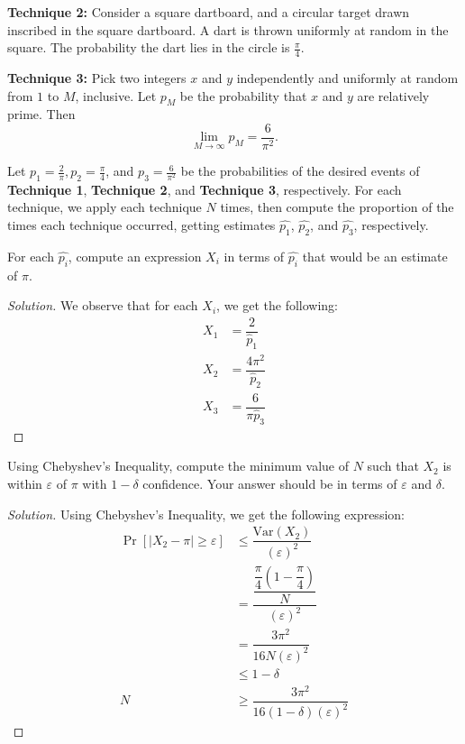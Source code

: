 \documentclass{article}
\newenvironment{solution}{\begin{proof}[Solution]}{\end{proof}}
\newcommand{\Var}{\mathrm{Var}}
\begin{document}
\textbf{Technique 2:} Consider a square dartboard, and a circular target drawn inscribed in the square dartboard. A dart is thrown uniformly at random in the square. The probability the dart lies in the circle is $\frac{\pi}{4}$.

\textbf{Technique 3:} Pick two integers $x$ and $y$ independently and uniformly at random from $1$ to $M$, inclusive. Let $p_M$ be the probability that $x$ and $y$ are relatively prime. Then 
\[\lim_{M \to \infty} p_M = \frac{6}{\pi^2}.\]

Let $p_1 = \frac{2}{\pi}, p_2 = \frac{\pi}{4}$, and $p_3 = \frac{6}{\pi^2}$ be the probabilities of the desired events of \textbf{Technique 1}, \textbf{Technique 2}, and \textbf{Technique 3}, respectively. For each technique, we apply each technique $N$ times, then compute the proportion of the times each technique occurred, getting estimates $\hat{p_1}$, $\hat{p_2}$, and $\hat{p_3}$, respectively.

\begin{hw}
	For each $\hat{p_i}$, compute an expression $X_i$ in terms of $\hat{p_i}$ that would be an estimate of $\pi$.
\end{hw}
\begin{solution}
	We observe that for each $X_{i}$, we get the following:
	\begin{align*}
		X_{1} &= \dfrac{2}{\hat{p}_{1}} \\
		X_{2} &= \dfrac{4\pi^{2}}{\hat{p}_{2}} \\
		X_{3} &= \dfrac{6}{\pi \hat{p}_{3}}
	\end{align*}
\end{solution}

\begin{hw}
	Using Chebyshev's Inequality, compute the minimum value of $N$ such that $X_2$ is within $\varepsilon$ of $\pi$ with $1 - \delta$ confidence. Your answer should be in terms of $\varepsilon$ and $\delta$.
\end{hw}
\begin{solution}
	Using Chebyshev's Inequality, we get the following expression:
	\begin{align*}
		\Pr[\lvert X_{2} - \pi \rvert \geq \varepsilon] &\leq \dfrac{\Var(X_{2})}{(\varepsilon)^{2}} \\
		&= \dfrac{\dfrac{\dfrac{\pi}{4}\left( 1 - \dfrac{\pi}{4} \right)}{N}}{(\varepsilon)^{2}} \\
		&= \dfrac{3\pi^{2}}{16N(\varepsilon)^{2}} \\
		& \leq 1 - \delta \\
		N &\geq \dfrac{3\pi^{2}}{16(1-\delta)(\varepsilon)^{2}}
	\end{align*}
\end{solution}
\end{document}
